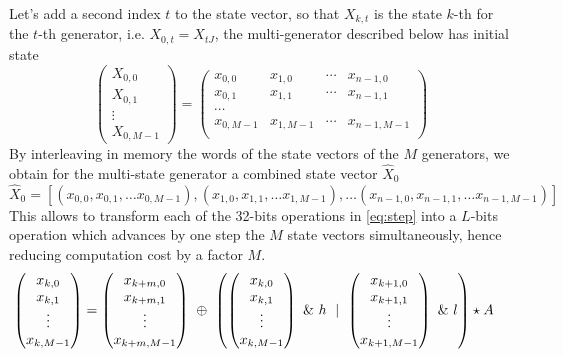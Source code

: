 \documentclass[preprint,1p,times]{elsarticle}
\begin{document}
Let's add a second index $t$ to the state vector, so that $X_{k,t}$ is the state $k$-th for the $t$-th generator, i.e. $X_{0,t}=X_{tJ}$, the multi-generator described below has initial state
$$
\begin{pmatrix}
    X_{0,0} \\ X_{0,1} \\ \vdots \\ X_{0,M-1}
\end{pmatrix}
= 
\begin{pmatrix}
    x_{0,0} & x_{1,0} & \cdots & x_{n-1,0} \\
    x_{0,1} & x_{1,1} & \cdots & x_{n-1,1} \\
    \cdots \\
    x_{0,M-1} & x_{1,M-1} & \cdots & x_{n-1,M-1} \\
\end{pmatrix}
$$
By interleaving in memory the words of the state vectors of the $M$ generators, we obtain for the multi-state generator a combined state vector $\hat{X}_0$
$$
    \hat{X}_0 = [(x_{0,0}, x_{0,1}, \dots x_{0,M-1}), (x_{1,0}, x_{1,1}, \dots x_{1,M-1}), \dots (x_{n-1,0}, x_{n-1,1}, \dots x_{n-1,M-1})]
$$
This allows to transform each of the 32-bits operations in \eqref{eq:step} into a $L$-bits operation which advances by one step the $M$ state vectors simultaneously, hence reducing computation cost by a factor $M$.
\begin{align}
\label{eq:msmt19937}
\begin{pmatrix}x_{k,0} \\ x_{k,1} \\ \vdots \\ x_{k,M-1} \end{pmatrix}
&= \begin{pmatrix}x_{k+m, 0} \\ x_{k+m,1} \\ \vdots \\ x_{k+m,M-1} \end{pmatrix} ~\mathbin{\oplus}~ \left(\begin{pmatrix}x_{k,0} \\ x_{k,1} \\ \vdots \\ x_{k,M-1} \end{pmatrix}~\&~h ~\mid~ \begin{pmatrix}x_{k+1,0} \\ x_{k+1,1} \\ \vdots \\ x_{k+1,M-1}  \end{pmatrix}~\&~l\right) \star A
\end{align}
\end{document}
